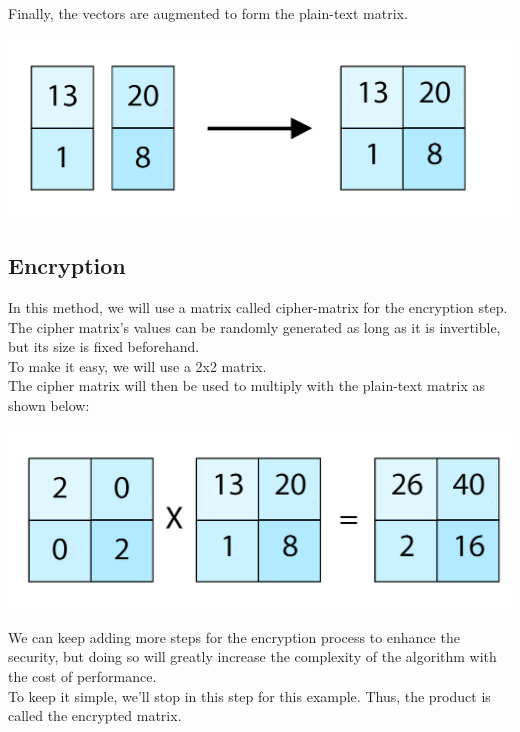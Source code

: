 \documentclass[11pt]{article}
\begin{document}
\begin{subs}
Finally, the vectors are augmented to form the plain-text matrix.
\begin{center} \includegraphics[scale=0.2]{MATH} \end{center}
\pagebreak

\subsection{Encryption}
In this method, we will use a matrix called cipher-matrix for the encryption step.\\The cipher matrix's values can be randomly generated as long as it is invertible, but its size is fixed beforehand.\vspace{5mm}\\
To make it easy, we will use a 2x2 matrix.\\The cipher matrix will then be used to multiply with the plain-text matrix as shown below:
\begin{center} \includegraphics[scale=0.2]{multiply_1} \end{center}\vspace{5mm}
We can keep adding more steps for the encryption process to enhance the security, but doing so will greatly increase the complexity of the algorithm with the cost of performance.\\
To keep it simple, we'll stop in this step for this example. Thus, the product is called the encrypted matrix.


\end{subs}
\end{document}
